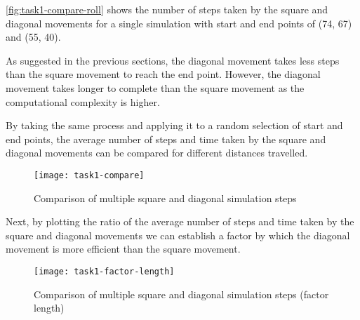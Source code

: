 \autoref{fig:task1-compare-roll} shows the number of steps taken by the square and diagonal movements for a single simulation with start and end points of (74, 67) and (55, 40).


As suggested in the previous sections, the diagonal movement takes less steps than the square movement to reach the end point.
However, the diagonal movement takes longer to complete than the square movement as the computational complexity is higher.



\clearpage

By taking the same process and applying it to a random selection of start and end points, 
the average number of steps and time taken by the square and diagonal movements can be compared for different distances travelled.



\begin{figure}[ht]
    \centering
    \texttt{[image: task1-compare]}
    \caption[Comparison of multiple square and diagonal simulation steps]{Comparison of multiple square and diagonal simulation steps}
    \label{fig:task1-compare}
\end{figure}

Next, by plotting the ratio of the average number of steps and time taken by the square and diagonal movements
we can establish a factor by which the diagonal movement is more efficient than the square movement.

\begin{figure}[ht]
    \centering
    \texttt{[image: task1-factor-length]}
    \caption[Comparison of multiple square and diagonal simulation steps (factor length)]{Comparison of multiple square and diagonal simulation steps (factor length)}
    \label{fig:task1-factor-length}
\end{figure}

